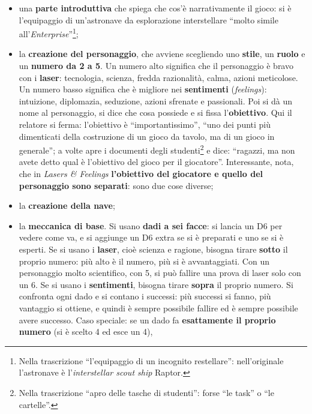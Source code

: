 \begin{itemize}
  \item una \textbf{parte introduttiva} che spiega che cos'è narrativamente il
        gioco: si è l'equipaggio di un'astronave da esplorazione interstellare
        ``molto simile all'\emph{Enterprise}''\footnote{Nella trascrizione
        ``l'equipaggio di un incognito restellare'': nell'originale l'astronave
        è l'\emph{interstellar scout ship} Raptor.};
  \item la \textbf{creazione del personaggio}, che avviene scegliendo uno
        \textbf{stile}, un \textbf{ruolo} e un \textbf{numero da 2 a 5}. Un
        numero alto significa che il personaggio è bravo con i \textbf{laser}:
        tecnologia, scienza, fredda razionalità, calma, azioni meticolose. Un
        numero basso significa che è migliore nei \textbf{sentimenti}
        (\emph{feelings}): intuizione, diplomazia, seduzione, azioni sfrenate e
        passionali. Poi si dà un nome al personaggio, si dice che cosa possiede e
        si fissa l'\textbf{obiettivo}. Qui il relatore si ferma: l'obiettivo è
        ``importantissimo'', ``uno dei punti più dimenticati della costruzione di
        un gioco da tavolo, ma di un gioco in generale''; a volte apre i
        documenti degli studenti\footnote{Nella trascrizione ``apro delle
        tasche di studenti'': forse ``le task'' o ``le cartelle''.} e dice:
        ``ragazzi, ma non avete detto qual è l'obiettivo del gioco per il
        giocatore''. Interessante, nota, che in \emph{Lasers \& Feelings}
        \textbf{l'obiettivo del giocatore e quello del personaggio sono
        separati}: sono due cose diverse;
  \item la \textbf{creazione della nave};
  \item la \textbf{meccanica di base}. Si usano \textbf{dadi a sei facce}: si
        lancia un D6 per vedere come va, e si aggiunge un D6 extra se si è
        preparati e uno se si è esperti. Se si usano i \textbf{laser}, cioè
        scienza e ragione, bisogna tirare \textbf{sotto} il proprio numero:
        più alto è il numero, più si è avvantaggiati. Con un personaggio molto
        scientifico, con 5, si può fallire una prova di laser solo con un 6. Se
        si usano i \textbf{sentimenti}, bisogna tirare \textbf{sopra} il proprio
        numero. Si confronta ogni dado e si contano i successi: più successi si
        fanno, più vantaggio si ottiene, e quindi è sempre possibile fallire ed
        è sempre possibile avere successo. Caso speciale: se un dado fa
        \textbf{esattamente il proprio numero} (si è scelto 4 ed esce un 4),

\end{itemize}
